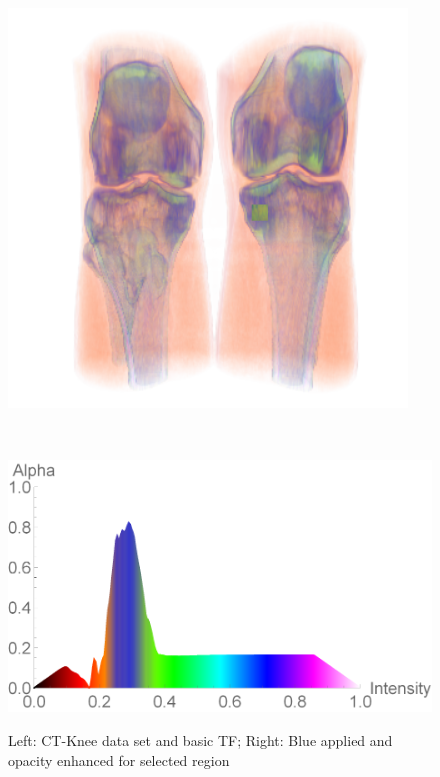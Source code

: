 \documentclass[twoside,twocolumn,10pt]{article}
\begin{document}
\begin{figure}
\begin{minipage}{.12\textwidth}
		\label{fig:tf_CT-Knee}
	\end{minipage}~
	\begin{minipage}{.1\textwidth}
		\centering
		\includegraphics[width=1\linewidth]{CT-Knee_blue_crop}
		\label{fig:CT-Knee_blue}
	\end{minipage}~
	\begin{minipage}{.12\textwidth}
		\centering
		\includegraphics[width=1\linewidth]{tf_CT-Knee_blue}
		\label{fig:tf_CT-Knee_blue}
	\end{minipage}
	\caption{Left: CT-Knee data set and basic TF; Right: Blue applied and opacity enhanced for selected region}
	\label{fig:CT-knee_all}
	
\end{figure}
\end{document}
